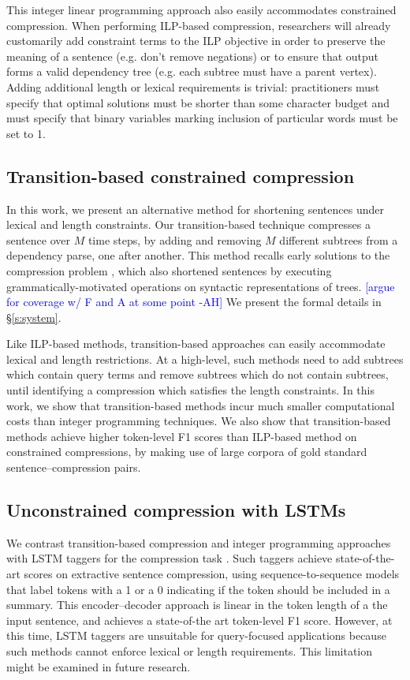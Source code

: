 \documentclass[11pt,a4paper]{article}
\newcommand{\ahcomment}[1]{\textcolor{blue}{[#1 -AH]}}
\begin{document}
This integer linear programming approach also easily accommodates constrained compression. When performing ILP-based compression, researchers will already customarily add constraint terms to the ILP objective in order to preserve the meaning of a sentence (e.g. don't remove negations) or to ensure that output forms a valid dependency tree (e.g. each subtree must have a parent vertex). Adding additional length or lexical requirements is trivial: practitioners must specify that optimal solutions must be shorter than some character budget and must specify that binary variables marking inclusion of particular words must be set to 1. 

\subsection{Transition-based constrained compression}

In this work, we present an alternative method for shortening sentences under lexical and length constraints. Our transition-based technique compresses a sentence over $M$ time steps, by adding and removing $M$ different subtrees from a dependency parse, one after another. This method recalls early solutions to the compression problem \cite{Jing2000SentenceRF,Knight2000StatisticsBasedS}, which also shortened sentences by executing grammatically-motivated operations on syntactic representations of trees. \ahcomment{argue for coverage w/ F and A at some point} We present the formal details in \S\ref{s:system}.

Like ILP-based methods, transition-based approaches can easily accommodate lexical and length restrictions. At a high-level, such methods need to add subtrees which contain query terms and remove subtrees which do not contain subtrees, until identifying a compression which satisfies the length constraints. In this work, we show that transition-based methods incur much smaller computational costs than integer programming techniques. We also show that transition-based methods achieve higher token-level F1 scores than ILP-based method on constrained compressions, by making use of large corpora of gold standard sentence--compression pairs.

\subsection{Unconstrained compression with LSTMs}

We contrast transition-based compression and integer programming approaches with LSTM taggers for the compression task \cite{filippova2015sentence}. Such taggers achieve state-of-the-art scores on extractive sentence compression, using sequence-to-sequence models that label tokens with a 1 or a 0 indicating if the token should be included in a summary. This encoder--decoder approach is linear in the token length of a the input sentence, and achieves a state-of-the art token-level F1 score. However, at this time, LSTM taggers are unsuitable for query-focused applications because such methods cannot enforce lexical or length requirements. This limitation might be examined in future research.
\end{document}
